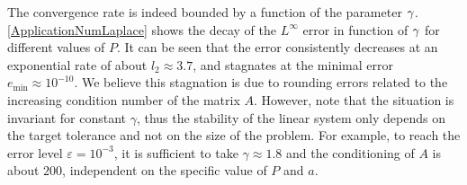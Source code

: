 \documentclass[smallextended]{svjour3}
\begin{document}
\begin{remark}
	The convergence rate is indeed bounded by a function of the parameter $\gamma$. \autoref{ApplicationNumLaplace} shows the decay of the $L^\infty$ error in function of $\gamma$ for different values of $P$. It can be seen that the error consistently decreases at an exponential rate of about $l_2 \approx 3.7$, and stagnates at the minimal error $e_{\min} \approx 10^{-10}$. We believe this stagnation is due to rounding errors related to the increasing condition number of the matrix $A$. However, note that the situation is invariant for constant $\gamma$, thus the stability of the linear system only depends on the target tolerance and not on the size of the problem. For example, to reach the error level $\varepsilon = 10^{-3}$, it is sufficient to take $\gamma \approx 1.8$ and the conditioning of $A$ is about $200$, independent on the specific value of $P$ and $a$.  
\end{remark}
\end{document}
